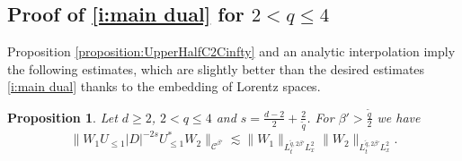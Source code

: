 \documentclass[a4paper]{amsart}
\numberwithin{equation}{section}%
\theoremstyle{plain}%
\newtheorem{proposition}[theorem]{Proposition}
\theoremstyle{definition}
\theoremstyle{remark}%
\begin{document}
\subsection{Proof of \eqref{i:main dual} for $2 < q \leq 4$}

Proposition \ref{proposition:UpperHalfC2Cinfty} and an analytic interpolation imply the following estimates, which are slightly better than the desired estimates \eqref{i:main dual} thanks to the embedding of Lorentz spaces.
\begin{proposition}\label{proposition:Schatten_UpperHalf}
Let $d \geq 2$, $2 < q\leq 4$ and $s= \frac{d-2}{2} + \frac{2}{\widetilde{q}}$. 
For $\beta'>\frac{\widetilde{q}}{2}$ we have
\begin{equation}\label{est:goal-prop3.2}
\| W_1 U_{\leq 1} |D|^{- 2s} U_{\leq 1}^* W_2 \|_{\mathcal{C}^{\beta'}} \lesssim \|W_1 \|_{L_t^{\widetilde{q}, 2\beta'} L_x^2} \|W_2 \|_{L_t^{\widetilde{q}, 2\beta'} L_x^2}.
\end{equation}
\end{proposition}
\end{document}
